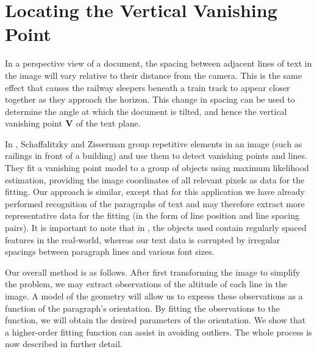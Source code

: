 
\section{Locating the Vertical Vanishing Point} \label{sec-vertvanish}


In a perspective view of a document, the spacing between adjacent lines of text
in the image will vary relative to their distance from the camera.  This is the
same effect that causes the railway sleepers beneath a train track to appear
closer together as they approach the horizon. This change in spacing can be used
to determine the angle at which the document is tilted, and hence the vertical
vanishing point ${ \bf V }$ of the text plane. 

In \cite{planargrouping}, Schaffalitzky and Zisserman group repetitive elements
in an image (such as railings in front of a building) and use them to detect 
vanishing points and lines. 
They fit a vanishing point model to a group of objects using maximum likelihood
estimation, providing the image coordinates of all relevant pixels as data for
the fitting. Our approach is similar, except that for this application we have 
already performed recognition of the paragraphs of text and may therefore 
extract more representative data for the fitting
(in the form of line position and line spacing pairs).
It is important to
note that in \cite{planargrouping}, the objects used contain regularly spaced
features in the real-world, whereas our text data is corrupted by irregular
spacings between paragraph lines and various font sizes.


Our overall method is as follows. After first transforming the image to 
simplify the problem, we may extract observations of the altitude of 
each line in the image.  A model of the geometry will allow us to express 
these observations as a function of the paragraph's orientation.  By 
fitting the observations to the function, we will obtain the desired 
parameters of the orientation.  We show that a higher-order fitting function 
can assist in avoiding outliers. The whole process is now described in
further detail.


